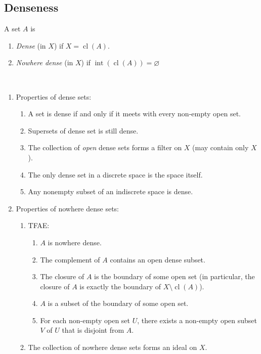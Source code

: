 \documentclass{treatise}
\begin{document}
\subsection{Denseness}
A set $A$ is
\begin{enumerate}
    \item \emph{Dense} (in $X$) if $X = \operatorname{cl}(A)$.
    \item \emph{Nowhere dense} (in $X$) if $\operatorname{int}(\operatorname{cl}(A)) = \varnothing$
\end{enumerate}
\begin{proposition} \ 
\begin{enumerate}
    \item Properties of dense sets:
    \begin{enumerate}
        \item A set is dense if and only if it meets with every non-empty open set.
        \item Supersets of dense set is still dense.
        \item The collection of \textit{open} dense sets forms a filter on $X$ (may contain only $X$).
        \item The only dense set in a discrete space is the space itself.
        \item Any nonempty subset of an indiscrete space is dense.
    \end{enumerate}
    \item Properties of nowhere dense sets:
    \begin{enumerate}
        \item TFAE:
        \begin{enumerate}
            \item $A$ is nowhere dense.
            \item The complement of $A$ contains an open dense subset.
            \item The closure of $A$ is the boundary of some open set (in particular, the closure of $A$ is exactly the boundary of $X \setminus \operatorname{cl}(A)$).
            \item $A$ is a subset of the boundary of some open set.
            \item For each non-empty open set $U$, there exists a non-empty open subset $V$ of $U$ that is disjoint from $A$.
        \end{enumerate}
        \item The collection of nowhere dense sets forms an ideal on $X$.
    \end{enumerate}
\end{enumerate}
\end{proposition}
\end{document}
